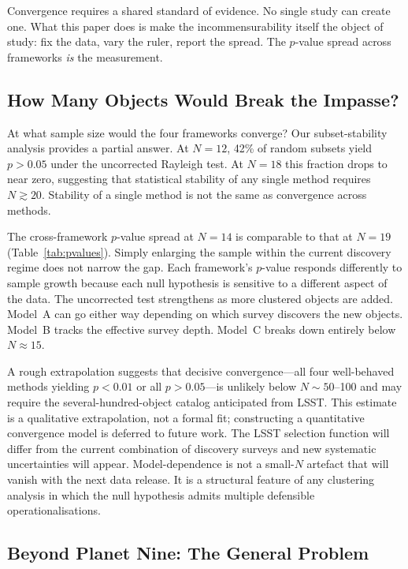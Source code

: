 \documentclass[usenatbib]{mnras}
\begin{document}
Convergence requires a shared standard of evidence. No single study can create one. What this paper does is make the incommensurability itself the object of study: fix the data, vary the ruler, report the spread. The $p$-value spread across frameworks \textit{is} the measurement.

\subsection{How Many Objects Would Break the Impasse?}

At what sample size would the four frameworks converge? Our subset-stability analysis provides a partial answer. At $N=12$, 42\% of random subsets yield $p>0.05$ under the uncorrected Rayleigh test. At $N=18$ this fraction drops to near zero, suggesting that statistical stability of any single method requires $N\gtrsim20$. Stability of a single method is not the same as convergence across methods.

The cross-framework $p$-value spread at $N=14$ is comparable to that at $N=19$ (Table~\ref{tab:pvalues}). Simply enlarging the sample within the current discovery regime does not narrow the gap. Each framework's $p$-value responds differently to sample growth because each null hypothesis is sensitive to a different aspect of the data. The uncorrected test strengthens as more clustered objects are added. Model~A can go either way depending on which survey discovers the new objects. Model~B tracks the effective survey depth. Model~C breaks down entirely below $N\approx15$.


A rough extrapolation suggests that decisive convergence---all four well-behaved methods yielding $p<0.01$ or all $p>0.05$---is unlikely below $N\sim50$--100 and may require the several-hundred-object catalog anticipated from LSST. This estimate is a qualitative extrapolation, not a formal fit; constructing a quantitative convergence model is deferred to future work. The LSST selection function will differ from the current combination of discovery surveys and new systematic uncertainties will appear. Model-dependence is not a small-$N$ artefact that will vanish with the next data release. It is a structural feature of any clustering analysis in which the null hypothesis admits multiple defensible operationalisations.

\subsection{Beyond Planet Nine: The General Problem}
\end{document}
